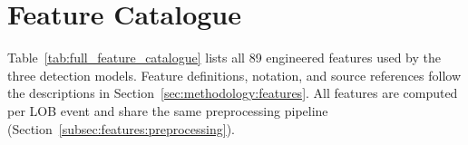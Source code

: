 \documentclass[11pt]{report}
\begin{document}
\printbibliography


\newpage
\appendix

\chapter{Feature Catalogue}\label{app:features}

Table~\ref{tab:full_feature_catalogue} lists all 89 engineered features used by the three detection models. Feature definitions, notation, and source references follow the descriptions in Section~\ref{sec:methodology:features}. All features are computed per LOB event and share the same preprocessing pipeline (Section~\ref{subsec:features:preprocessing}).
\end{document}
